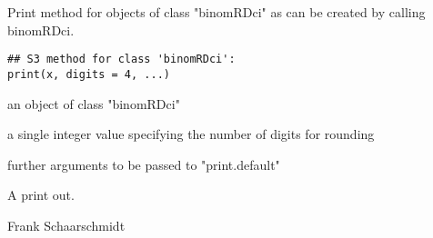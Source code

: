 \begin{Description}\relax
Print method for objects of class "binomRDci" as can be created by calling binomRDci.
\end{Description}
\begin{Usage}
\begin{verbatim}
## S3 method for class 'binomRDci':
print(x, digits = 4, ...)
\end{verbatim}
\end{Usage}
\begin{Arguments}
\begin{ldescription}
\item[\code{x}] an object of class "binomRDci" 
\item[\code{digits}] a single integer value specifying the number of digits for rounding 
\item[\code{...}] further arguments to be passed to "print.default" 
\end{ldescription}
\end{Arguments}
\begin{Value}
A print out.
\end{Value}
\begin{Author}\relax
Frank Schaarschmidt
\end{Author}

